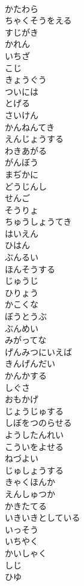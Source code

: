 \documentclass[8pt]{extreport}
\begin{document}
\begin{CJK}{UTF8}{min}
\\	かたわら
\\	ちゃくそうをえる
\\	すじがき
\\	かれん
\\	いちざ
\\	こじ
\\	きょうぐう
\\	ついには
\\	とげる
\\	さいけん
\\	かんねんてき
\\	えんじょうする
\\	わきあがる
\\	がんぼう
\\	まぢかに
\\	どうじんし
\\	せんご
\\	そうりょ
\\	ちゅうしょうてき
\\	はいえん
\\	ひはん
\\	ぶんるい
\\	ほんそうする
\\	じゅうじ
\\	ひりょう
\\	かこくな
\\	ぼうとうぶ
\\	ぶんめい
\\	みがってな
\\	げんみつにいえば
\\	きんげんだい
\\	かんかする
\\	しぐさ
\\	おもかげ
\\	じょうじゅする
\\	しぼをつのらせる
\\	ようしたんれい
\\	こういをよせる
\\	ねづよい
\\	じゅしょうする
\\	きゃくほんか
\\	えんしゅつか
\\	かきたてる
\\	いきいきとしている
\\	いっそう
\\	いちやく
\\	かいしゃく
\\	しじ
\\	ひゆ

\end{CJK}
\end{document}
